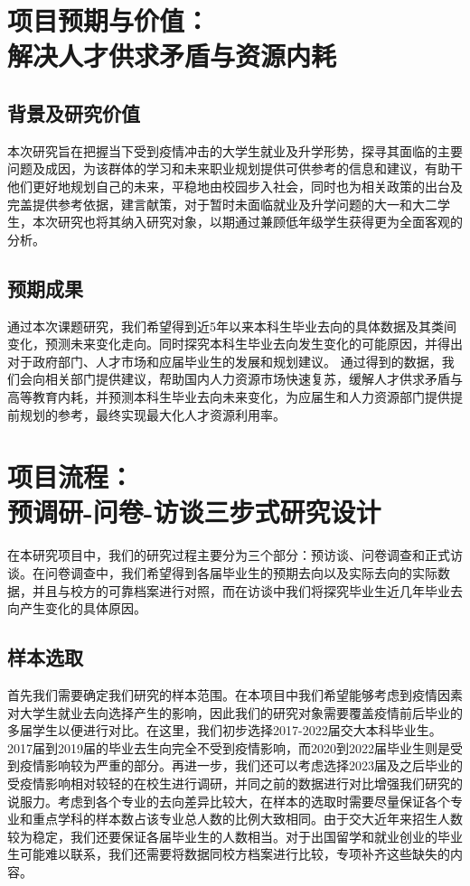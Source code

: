 \documentclass[a4paper]{IEEEtran}
\begin{document}
		\section{项目预期与价值：\\解决人才供求矛盾与资源内耗}
		\subsection{背景及研究价值}
		本次研究旨在把握当下受到疫情冲击的大学生就业及升学形势，探寻其面临的主要问题及成因，为该群体的学习和未来职业规划提供可供参考的信息和建议，有助干他们更好地规划自己的未来，平稳地由校园步入社会，同时也为相关政策的出台及完盖提供参考依据，建言献策，对于暂时未面临就业及升学问题的大一和大二学生，本次研究也将其纳入研究对象，以期通过兼顾低年级学生获得更为全面客观的分析。
		\subsection{预期成果}
		通过本次课题研究，我们希望得到近5年以来本科生毕业去向的具体数据及其类间变化，预测未来变化走向。同时探究本科生毕业去向发生变化的可能原因，并得出对于政府部门、人才市场和应届毕业生的发展和规划建议。
		通过得到的数据，我们会向相关部门提供建议，帮助国内人力资源市场快速复苏，缓解人才供求矛盾与高等教育内耗，并预测本科生毕业去向未来变化，为应届生和人力资源部门提供提前规划的参考，最终实现最大化人才资源利用率。
		\section{项目流程：\\预调研-问卷-访谈三步式研究设计}
		在本研究项目中，我们的研究过程主要分为三个部分：预访谈、问卷调查和正式访谈。在问卷调查中，我们希望得到各届毕业生的预期去向以及实际去向的实际数据，并且与校方的可靠档案进行对照，而在访谈中我们将探究毕业生近几年毕业去向产生变化的具体原因。
		\subsection{样本选取}
		首先我们需要确定我们研究的样本范围。在本项目中我们希望能够考虑到疫情因素对大学生就业去向选择产生的影响，因此我们的研究对象需要覆盖疫情前后毕业的多届学生以便进行对比。在这里，我们初步选择2017-2022届交大本科毕业生。2017届到2019届的毕业去生向完全不受到疫情影响，而2020到2022届毕业生则是受到疫情影响较为严重的部分。再进一步，我们还可以考虑选择2023届及之后毕业的受疫情影响相对较轻的在校生进行调研，并同之前的数据进行对比增强我们研究的说服力。考虑到各个专业的去向差异比较大，在样本的选取时需要尽量保证各个专业和重点学科的样本数占该专业总人数的比例大致相同。由于交大近年来招生人数较为稳定，我们还要保证各届毕业生的人数相当。对于出国留学和就业创业的毕业生可能难以联系，我们还需要将数据同校方档案进行比较，专项补齐这些缺失的内容。
\end{document}
